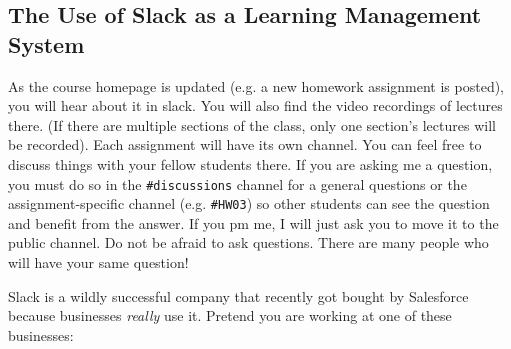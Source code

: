 \subsection*{The Use of Slack as a Learning Management System}

As the course homepage is updated (e.g. a new homework assignment is posted), you will hear about it in slack. You will also find the video recordings of lectures there. (If there are multiple sections of the class, only one section's lectures will be recorded). Each assignment will have its own channel. You can feel free to discuss things with your fellow students there. If you are asking me a question, you must do so in the \texttt{\#discussions} channel for a general questions or the assignment-specific channel (e.g. \texttt{\#HW03}) so other students can see the question and benefit from the answer. If you pm me, I will just ask you to move it to the public channel. Do not be afraid to ask questions. There are many people who will have your same question! 

Slack is a wildly successful company that recently got bought by Salesforce because businesses \emph{really} use it. Pretend you are working at one of these businesses:  